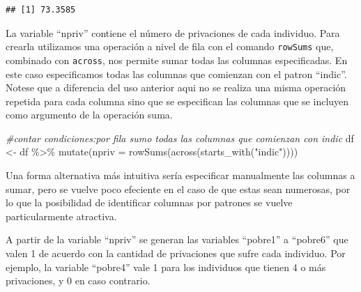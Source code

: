 \documentclass[
]{book}
\newenvironment{Shaded}{\begin{snugshade}}{\end{snugshade}}
\newcommand{\AttributeTok}[1]{\textcolor[rgb]{0.77,0.63,0.00}{#1}}
\newcommand{\CommentTok}[1]{\textcolor[rgb]{0.56,0.35,0.01}{\textit{#1}}}
\newcommand{\FunctionTok}[1]{\textcolor[rgb]{0.00,0.00,0.00}{#1}}
\newcommand{\NormalTok}[1]{#1}
\newcommand{\OtherTok}[1]{\textcolor[rgb]{0.56,0.35,0.01}{#1}}
\newcommand{\SpecialCharTok}[1]{\textcolor[rgb]{0.00,0.00,0.00}{#1}}
\newcommand{\StringTok}[1]{\textcolor[rgb]{0.31,0.60,0.02}{#1}}
\begin{document}
\begin{verbatim}
## [1] 73.3585
\end{verbatim}

La variable ``npriv'' contiene el número de privaciones de cada individuo. Para crearla utilizamos una operación a nivel de fila con el comando \texttt{rowSums} que, combinado con \texttt{across}, nos permite sumar todas las columnas especificadas. En este caso especificamos todas las columnas que comienzan con el patron ``indic''. Notese que a diferencia del uso anterior aqui no se realiza una misma operación repetida para cada columna sino que se especifican las columnas que se incluyen como argumento de la operación suma.

\begin{Shaded}
\begin{Highlighting}[]
\CommentTok{\#contar condiciones:por fila sumo todas las columnas que comienzan con indic}
\NormalTok{df }\OtherTok{\textless{}{-}}\NormalTok{ df }\SpecialCharTok{\%\textgreater{}\%} \FunctionTok{mutate}\NormalTok{(}\AttributeTok{npriv =} \FunctionTok{rowSums}\NormalTok{(}\FunctionTok{across}\NormalTok{(}\FunctionTok{starts\_with}\NormalTok{(}\StringTok{"indic"}\NormalTok{)))) }
\end{Highlighting}
\end{Shaded}

Una forma alternativa más intuitiva sería especificar manualmente las columnas a sumar, pero se vuelve poco efeciente en el caso de que estas sean numerosas, por lo que la posibilidad de identificar columnas por patrones se vuelve particularmente atractiva.

\begin{Shaded}
\end{Shaded}

A partir de la variable ``npriv'' se generan las variables ``pobre1'' a ``pobre6'' que valen 1 de acuerdo con la cantidad de privaciones que sufre cada individuo. Por ejemplo, la variable ``pobre4'' vale 1 para los individuos que tienen 4 o más privaciones, y 0 en caso contrario.
\end{document}

